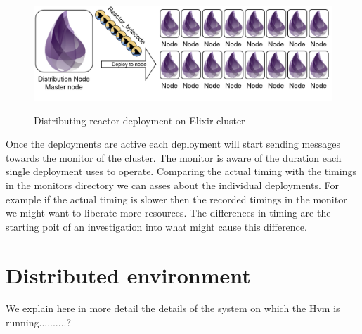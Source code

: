 \documentclass[a4paper]{book}
\begin{document}
\begin{figure}[h]
	\caption{Distributing reactor deployment on Elixir cluster}
	\includegraphics[width=\textwidth]{distribution300.drawio}
	\label{fig:rdi}
\end{figure}  

Once the deployments are active each deployment will start sending messages towards the monitor of the cluster. The monitor is aware of the duration each single deployment uses to operate. Comparing the actual timing with the timings in the monitors directory we can asses about the individual deployments. For example if the actual timing is slower then the recorded timings in the monitor we might want to liberate more resources. The differences in timing are the starting poit of an investigation into what might cause this difference.

\section{Distributed environment}
We explain here in more detail the details of the system on which the Hvm is running..........?
\end{document}
